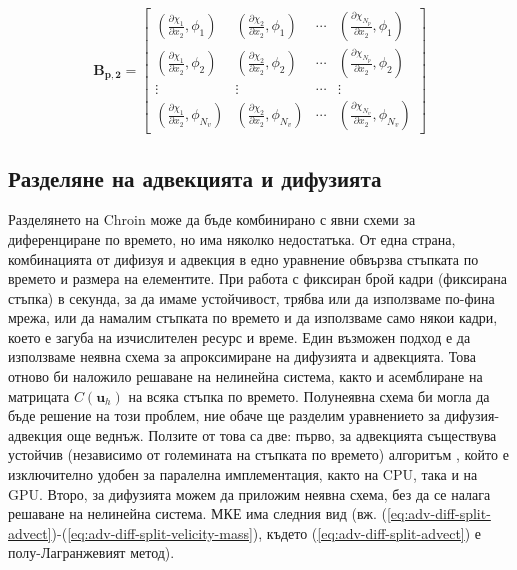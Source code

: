 \documentclass[12pt]{report}
\begin{document}
\begin{equation*}
	\mathbf{B_{p,2}} = \begin{bmatrix}
		\left(\frac{\partial\chi_1}{\partial x_2}, \phi_1\right) & \left(\frac{\partial\chi_2}{\partial x_2}, \phi_1\right) & \cdots & \left(\frac{\partial\chi_{N_p}}{\partial x_2}, \phi_1\right) \\
		\left(\frac{\partial\chi_1}{\partial x_2}, \phi_2\right) & \left(\frac{\partial\chi_2}{\partial x_2}, \phi_2\right) & \cdots & \left(\frac{\partial\chi_{N_p}}{\partial x_2}, \phi_2\right) \\
		\vdots & \vdots & \cdots & \vdots \\
		\left(\frac{\partial\chi_1}{\partial x_2}, \phi_{N_v}\right) & \left(\frac{\partial\chi_2}{\partial x_2}, \phi_{N_v}\right) & \cdots & \left(\frac{\partial\chi_{N_v}}{\partial x_2}, \phi_{N_v}\right)
	\end{bmatrix}
\end{equation*}

\subsection{Разделяне на адвекцията и дифузията}
Разделянето на Chroin може да бъде комбинирано с явни схеми за диференциране по времето, но има няколко недостатъка. От една страна, комбинацията от дифизуя и адвекция в едно уравнение обвързва стъпката по времето и размера на елементите. При работа с фиксиран брой кадри (фиксирана стъпка) в секунда, за да имаме устойчивост, трябва или да използваме по-фина мрежа, или да намалим стъпката по времето и да използваме само някои кадри, което е загуба на изчислителен ресурс и време. Един възможен подход е да използваме неявна схема за апроксимиране на дифузията и адвекцията. Това отново би наложило решаване на нелинейна система, както и асемблиране на матрицата $C(\mathbf{u}_h)$ на всяка стъпка по времето. Полунеявна схема би могла да бъде решение на този проблем, ние обаче ще разделим уравнението за дифузия-адвекция още веднъж. Ползите от това са две: първо, за адвекцията съществува устойчив (независимо от големината на стъпката по времето) алгоритъм \cite{semi-lagrangian-stability}, който е изключително удобен за паралелна имплементация, както на CPU, така и на GPU. Второ, за дифузията можем да приложим неявна схема, без да се налага решаване на нелинейна система. МКЕ има следния вид (вж. (\ref{eq:adv-diff-split-advect})-(\ref{eq:adv-diff-split-velicity-mass}), където (\ref{eq:adv-diff-split-advect}) е полу-Лагранжевият метод).
\end{document}
